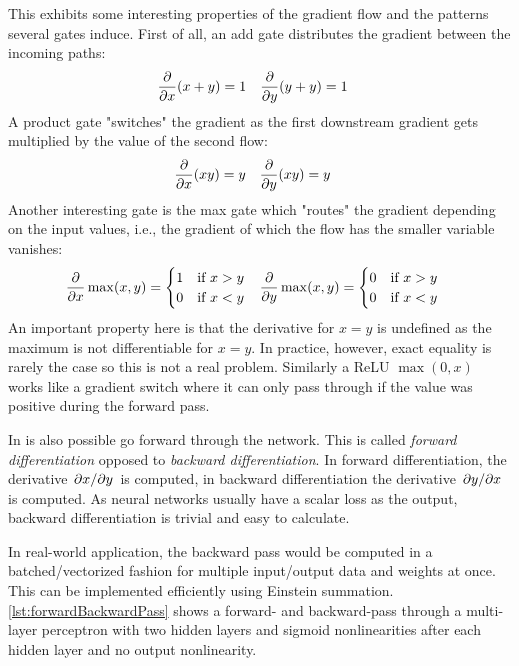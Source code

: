 	This exhibits some interesting properties of the gradient flow and the patterns several gates induce. First of all, an add gate distributes the gradient between the incoming paths:
	\begin{align}
		\pdv{x} (x + y) &= 1 &
		\pdv{y} (y + y) &= 1
	\end{align}
	A product gate "switches" the gradient as the first downstream gradient gets multiplied by the value of the second flow:
	\begin{align}
		\pdv{x} (xy) &= y &
		\pdv{y} (xy) &= y
	\end{align}
	Another interesting gate is the max gate which "routes" the gradient depending on the input values, i.e., the gradient of which the flow has the smaller variable vanishes:
	\begin{align}
		\pdv{x} \max(x, y) &=
			\begin{cases}
				1 & \text{if } x > y \\
				0 & \text{if } x < y
			\end{cases} &
		\pdv{y} \max(x, y) &=
			\begin{cases}
				0 & \text{if } x > y \\
				0 & \text{if } x < y
			\end{cases}
	\end{align}
	An important property here is that the derivative for \(x = y\) is undefined as the maximum is not differentiable for \(x = y\). In practice, however, exact equality is rarely the case so this is not a real problem. Similarly a ReLU \( \max(0, x) \) works like a gradient switch where it can only pass through if the value was positive during the forward pass.

	In is also possible go forward through the network. This is called \emph{forward differentiation} opposed to \emph{backward differentiation}. In forward differentiation, the derivative \( \pdv*{x}{y} \) is computed, in backward differentiation the derivative \( \pdv*{y}{x} \) is computed. As neural networks usually have a scalar loss as the output, backward differentiation is trivial and easy to calculate.

	In real-world application, the backward pass would be computed in a batched/vectorized fashion for multiple input/output data and weights at once. This can be implemented efficiently using Einstein summation. \autoref{lst:forwardBackwardPass} shows a forward- and backward-pass through a multi-layer perceptron with two hidden layers and sigmoid nonlinearities after each hidden layer and no output nonlinearity.

